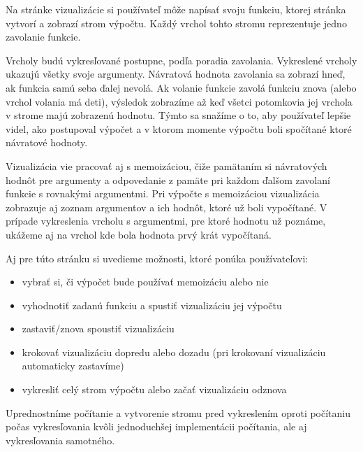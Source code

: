 Na stránke vizualizácie si používateľ môže napísať svoju funkciu, ktorej stránka vytvorí
a zobrazí strom výpočtu. Každý vrchol tohto stromu reprezentuje jedno zavolanie funkcie.

Vrcholy budú vykresľované postupne, podľa poradia zavolania.
Vykreslené vrcholy ukazujú všetky svoje argumenty. Návratová hodnota zavolania
sa zobrazí hneď, ak funkcia samú seba ďalej nevolá. Ak volanie funkcie zavolá funkciu znova (alebo vrchol volania má deti),
výsledok zobrazíme až keď všetci potomkovia jej vrchola v strome
majú zobrazenú hodnotu. Týmto sa snažíme o to, aby používateľ lepšie videl, ako postupoval výpočet a v ktorom momente výpočtu
boli spočítané ktoré návratové hodnoty.

Vizualizácia vie pracovať aj s memoizáciou, čiže pamätaním si návratových hodnôt pre
argumenty a odpovedanie z pamäte pri každom ďalšom zavolaní funkcie s rovnakými argumentmi.
Pri výpočte s memoizáciou vizualizácia zobrazuje aj zoznam argumentov a ich hodnôt, ktoré už boli vypočítané.
V prípade vykreslenia vrcholu s argumentmi, pre ktoré hodnotu už poznáme, ukážeme aj na vrchol
kde bola hodnota prvý krát vypočítaná.

Aj pre túto stránku si uvedieme možnosti, ktoré ponúka používateľovi:
\begin{itemize}
  \item vybrať si, či výpočet bude používať memoizáciu alebo nie
  \item vyhodnotiť zadanú funkciu a spustiť vizualizáciu jej výpočtu
  \item zastaviť/znova spoustiť vizualizáciu
  \item krokovať vizualizáciu dopredu alebo dozadu (pri krokovaní vizualizáciu
   automaticky zastavíme)
  \item vykresliť celý strom výpočtu alebo začať vizualizáciu odznova
\end{itemize}

Uprednostníme počítanie a vytvorenie stromu pred vykreslením oproti počítaniu počas vykresľovania
kvôli jednoduchšej implementácii počítania, ale aj vykresľovania samotného.
